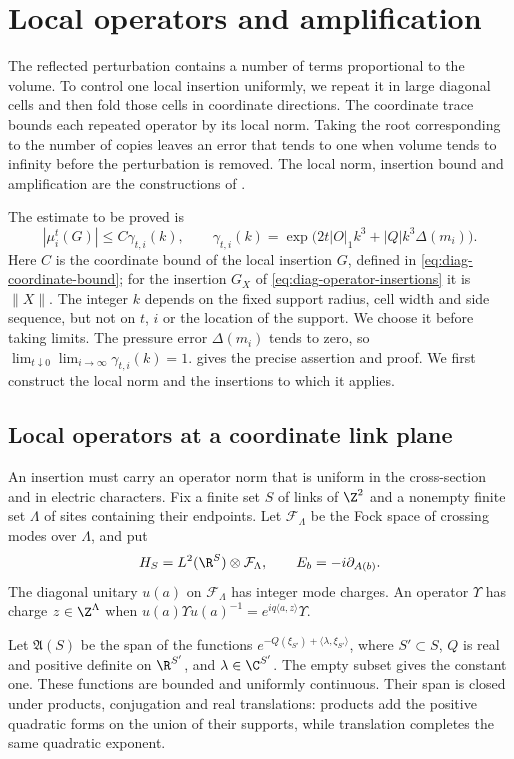 \section{Local operators and amplification}\label{sec:local-amplification}

The reflected perturbation contains a number of terms proportional to
the volume. To control one local insertion uniformly, we repeat it
in large diagonal cells and then fold those cells in coordinate
directions. The coordinate trace bounds each repeated operator by
its local norm. Taking the root corresponding to the number of
copies leaves an error that tends to one when volume tends to
infinity before the perturbation is removed. The local norm, insertion
bound and amplification are the constructions of
\cite[Lemma~8.13, Proposition~8.26 and Theorem~8.32]{ChamberQED}.

The estimate to be proved is
\[
 |\mu_i^t(G)|\le C\gamma_{t,i}(k),\qquad
 \gamma_{t,i}(k)=
 \exp\bigl(2t|O|_1k^3+|Q|k^3\Delta(m_i)\bigr).
\]
Here $C$ is the coordinate bound of the local insertion $G$, defined
in \eqref{eq:diag-coordinate-bound}; for the insertion $G_X$ of
\eqref{eq:diag-operator-insertions} it is $\|X\|$.
The integer $k$ depends on the fixed support
radius, cell width and side sequence, but not on $t$, $i$ or the
location of the support. We choose it before taking limits. The
pressure error $\Delta(m_i)$ tends to zero, so
$\lim_{t\downarrow0}\lim_{i\to\infty}\gamma_{t,i}(k)=1$.
 gives the precise assertion and proof.
We first construct the local norm and the insertions to which it applies.

\subsection{Local operators at a coordinate link plane}\label{subsec:diag-local-operators}

An insertion must carry an operator norm that is uniform in the
cross-section and in electric characters. Fix a finite set $S$ of
links of $\Z^2$ and a nonempty finite set $\Lambda$ of sites
containing their endpoints. Let $\mathcal F_\Lambda$ be the Fock
space of crossing modes over $\Lambda$, and put
\[
 H_S=L^2(\R^S)\otimes\mathcal F_\Lambda,
 \qquad E_b=-i\partial_{A(b)}.
\]
The diagonal unitary $u(a)$ on $\mathcal F_\Lambda$ has integer mode
charges. An operator $\Upsilon$ has charge $z\in\Z^\Lambda$ when
$u(a)\Upsilon u(a)^{-1}=e^{iq\langle a,z\rangle}\Upsilon$.

Let $\mathfrak A(S)$ be the span of the functions
$e^{-Q(\xi_{S'})+\langle\lambda,\xi_{S'}\rangle}$, where
$S'\subset S$, $Q$ is real and positive definite on $\R^{S'}$,
and $\lambda\in\C^{S'}$. The empty subset gives the constant one.
These functions are bounded and uniformly continuous. Their span
is closed under products, conjugation and real translations: products
add the positive quadratic forms on the union of their supports,
while translation completes the same quadratic exponent.

